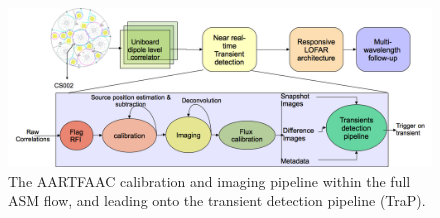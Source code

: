 \documentclass{aa}
\begin{document}
\begin{figure}[tbh]
\centering
\includegraphics[width=1\textwidth]{Figs/AFAAC_blkdia_latest.png}
\caption{The    AARTFAAC   calibration   and
  imaging  pipeline within the  full ASM  flow, and  leading onto  the transient
  detection pipeline (TraP).}
\label{fig:The-AARTFAAC-calibration}
\end{figure}
\end{document}

